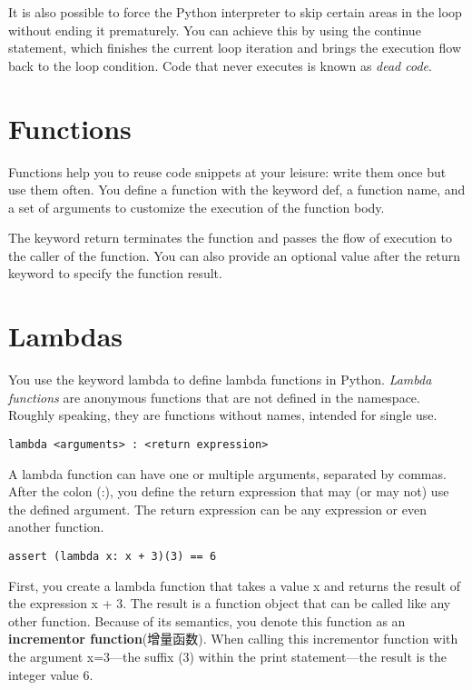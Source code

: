 It is also possible to force the Python interpreter to skip certain areas in the loop without ending it prematurely. You can achieve this by using the continue statement, which finishes the current loop iteration and brings the execution flow back to the loop condition. Code that never executes is known as \textit{dead code}.
\section{Functions}
Functions help you to reuse code snippets at your leisure: write them once but use them often. You define a function with the keyword \textsf{def}, a function name, and a set of arguments to customize the execution of the function body.

The keyword \textsf{return} terminates the function and passes the flow of execution to the caller of the function. You can also provide an optional value after the return keyword to specify the function result.

\section{Lambdas}
You use the keyword \textsf{lambda} to define lambda functions in Python. \textit{Lambda functions} are anonymous functions that are not defined in the namespace. Roughly speaking, they are functions without names, intended for single use.

\verb|lambda <arguments> : <return expression>|

A lambda function can have one or multiple arguments, separated by
commas. After the colon (:), you define the return expression that may
(or may not) use the defined argument. The return expression can be any
expression or even another function.

\verb|assert (lambda x: x + 3)(3) == 6|

First, you create a lambda function that takes a value x and returns
the result of the expression x + 3. The result is a function object that can
be called like any other function. Because of its semantics, you denote
this function as an \textbf{incrementor function}(增量函数). When calling this incrementor
function with the argument x=3—the suffix (3) within the print statement—the result is the integer value 6.